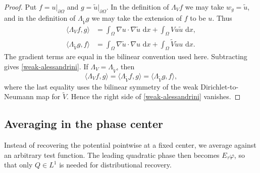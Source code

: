 \documentclass[a4paper,11pt]{article}
\newcommand{\dd}{\,\text{d}}
\theoremstyle{plain}
\theoremstyle{definition}
\theoremstyle{remark}
\begin{document}
\begin{proof}
Put $f=u|_{\partial\Omega}$ and $g=\widetilde u|_{\partial\Omega}$.  In the definition of $\Lambda_V f$ we may take $w_g=\widetilde u$, and in the definition of $\Lambda_{\widetilde V}g$ we may take the extension of $f$ to be $u$.  Thus
\begin{align*}
        \langle \Lambda_V f,g\rangle
        &=\int_\Omega \nabla u\cdot\nabla \widetilde u\,\dd x+
          \int_\Omega Vu\widetilde u\,\dd x,\\
        \langle \Lambda_{\widetilde V}g,f\rangle
        &=\int_\Omega \nabla \widetilde u\cdot\nabla u\,\dd x+
          \int_\Omega \widetilde V\widetilde u u\,\dd x.
\end{align*}
The gradient terms are equal in the bilinear convention used here.  Subtracting gives \eqref{weak-alessandrini}.  If $\Lambda_V=\Lambda_{\widetilde V}$, then
\begin{equation*}
        \langle \Lambda_V f,g\rangle
        =\langle \Lambda_{\widetilde V} f,g\rangle
        =\langle \Lambda_{\widetilde V} g,f\rangle,
\end{equation*}
where the last equality uses the bilinear symmetry of the weak Dirichlet-to-Neumann map for $\widetilde V$.  Hence the right side of \eqref{weak-alessandrini} vanishes.
\end{proof}


\subsection{Averaging in the phase center}

Instead of recovering the potential pointwise at a fixed center, we average against an arbitrary test function.  The leading quadratic phase then becomes $E_\tau\varphi$, so that only $Q\in L^1$ is needed for distributional recovery.
\end{document}
